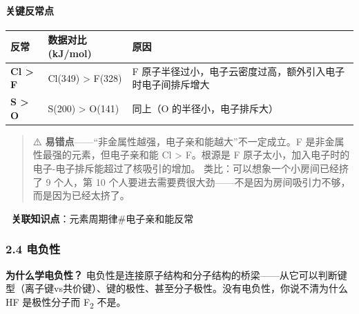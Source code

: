 \documentclass[a4paper,11pt]{ctexart}
\newcounter{none}
\begin{document}
\paragraph{关键反常点}\label{ux5173ux952eux53cdux5e38ux70b9-1}

{\def\LTcaptype{none} %
\begin{longtable}[]{@{}
  >{\raggedright\arraybackslash}p{}
  >{\raggedright\arraybackslash}p{}
  >{\raggedright\arraybackslash}p{}@{}}
\toprule\noalign{}
\begin{minipage}[b]{\linewidth}\raggedright
反常
\end{minipage} & \begin{minipage}[b]{\linewidth}\raggedright
数据对比 (kJ/mol)
\end{minipage} & \begin{minipage}[b]{\linewidth}\raggedright
原因
\end{minipage} \\
\midrule\noalign{}
\endhead
\bottomrule\noalign{}
\endlastfoot
\textbf{Cl \textgreater{} F} & Cl(349) \textgreater{} F(328) & F 原子半径过小，电子云密度过高，额外引入电子时电子间排斥增大 \\
\textbf{S \textgreater{} O} & S(200) \textgreater{} O(141) & 同上（O 的半径小，电子排斥大） \\
\end{longtable}
}

\begin{quote}
⚠️ \textbf{易错点}------``非金属性越强，电子亲和能越大''不一定成立。F 是非金属性最强的元素，但电子亲和能 Cl \textgreater{} F。根源是 F 原子太小，加入电子时的电子-电子排斥能超过了核吸引的增加。
类比：可以想象一个小房间已经挤了 9 个人，第 10 个人要进去需要费很大劲------不是因为房间吸引力不够，而是因为已经太挤了。
\end{quote}

🔗 \textbf{关联知识点}：元素周期律\#电子亲和能反常

\subsubsection{2.4 电负性}\label{ux7535ux8d1fux6027}

\textbf{为什么学电负性？} 电负性是连接原子结构和分子结构的桥梁------从它可以判断键型（离子键vs共价键）、键的极性、甚至分子极性。没有电负性，你说不清为什么 HF 是极性分子而 F\textsubscript{2} 不是。
\end{document}
